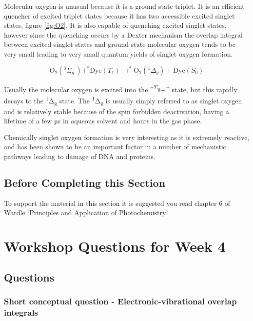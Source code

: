 \documentclass[
]{book}
\begin{document}
Molecular oxygen is unusual because it is a ground state triplet. It is an efficient quencher of excited triplet states because it has two accessible excited singlet states, figure \ref{fig:O2}. It is also capable of quenching excited singlet states, however since the quenching occurs by a Dexter mechanism the overlap integral between excited singlet states and ground state molecular oxygen tends to be very small leading to very small quantum yields of singlet oxygen formation.

\begin{equation}
\textrm{O}_2(^3 \Sigma _g^-)+ ^\ast \textrm{Dye}(T_1) \longrightarrow ^\ast \textrm{O}_2(^1 \Delta _g) + \textrm{Dye}(S_0)
\label{eq:O2quench}
\end{equation}

Usually the molecular oxygen is excited into the \^{}\textsuperscript{Σ\textsubscript{g}}+\^{} state, but this rapidly decays to the \textsuperscript{1}Δ\textsubscript{g} state. The \textsuperscript{1}Δ\textsubscript{g} is usually simply referred to as singlet oxygen and is relatively stable because of the spin forbidden deactivation, having a lifetime of a few µs in aqueous solvent and hours in the gas phase.

Chemically singlet oxygen formation is very interesting as it is extremely reactive, and has been shown to be an important factor in a number of mechanistic pathways leading to damage of DNA and proteins.

\hypertarget{before-completing-this-section-1}{%
\section{Before Completing this Section}\label{before-completing-this-section-1}}

To support the material in this section it is suggested you read chapter 6 of Wardle `Principles and Application of Photochemistry'.

\hypertarget{ch:Workshop3}{%
\chapter{Workshop Questions for Week 4}\label{ch:Workshop3}}

\hypertarget{questions}{%
\section{Questions}\label{questions}}

\hypertarget{sec:overlap}{%
\subsection{Short conceptual question - Electronic-vibrational overlap integrals}\label{sec:overlap}}
\end{document}
